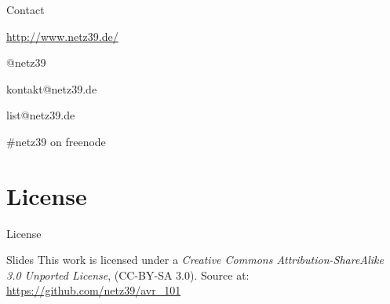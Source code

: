 \documentclass{beamer}
\begin{document}
\begin{frame}{Contact}
    \begin{center}
        \begin{description}
            \item[WWW] \url{http://www.netz39.de/}
            \item[Twitter/identi.ca] @netz39
            \item[E-Mail] kontakt@netz39.de
            \item[Mailingliste] list@netz39.de
            \item[IRC] \#netz39 on freenode
        \end{description}
    \end{center}
\end{frame}

\appendix

\section{License}

\begin{frame}{License}
    \begin{block}{Slides}
        This work is licensed under a \emph{Creative Commons
        Attribution-ShareAlike 3.0 Unported License}, (CC-BY-SA 3.0).
        Source at: \url{https://github.com/netz39/avr_101}
    \end{block}
\end{frame}
\end{document}
